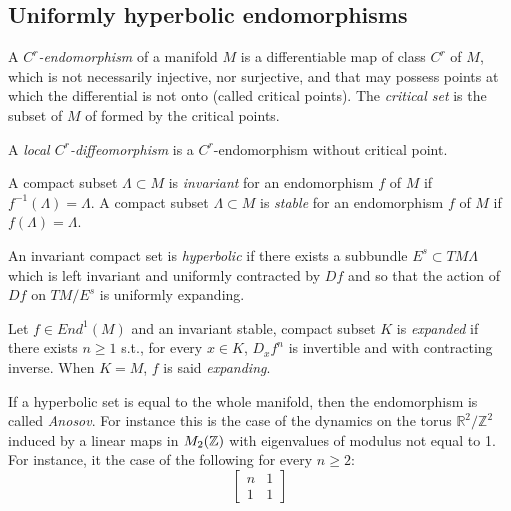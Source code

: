\documentclass[11pt,openany,leqno]{article}
\begin{document}
\subsection{Uniformly hyperbolic endomorphisms}


A \emph{$C^r$-endomorphism} of a manifold $M$ is a differentiable map of class $C^r$ of $M$, which is not necessarily injective, nor surjective, and that may possess points at which the differential is not onto (called critical points). The \emph{critical set} is the subset of $M$ of formed by the critical points. 

A \emph{local $C^r$-diffeomorphism} is a $C^r$-endomorphism without critical point.

A compact subset $\Lambda\subset M$ is \emph{invariant} for an endomorphism $f$ of $M$ if $f^{-1} (\Lambda)=\Lambda$. 
A compact subset $\Lambda\subset M$ is \emph{stable} for an endomorphism $f$ of $M$ if $f (\Lambda)=\Lambda$.

An invariant compact set is \emph{hyperbolic} if there exists a subbundle $E^s\subset TM \Lambda$ which is left invariant  and uniformly contracted by $Df$ and so that the action of $Df$ on $TM/E^s$ is uniformly expanding.

\begin{exam}
Let $f\in End^1(M)$ and  an invariant stable, compact  subset $K$ is \emph{expanded} if there exists $n\ge 1$ s.t., for every $x\in K$,  $D_xf^n$ is invertible and with contracting inverse. When  $K=M$, $f$ is said \emph{expanding}.
\end{exam}   
\begin{exam} If a hyperbolic set is equal to the whole manifold, then the endomorphism is called \emph{Anosov}. 
For instance this is the case of the dynamics on the torus $\mathbb R^2/\mathbb Z^2$ induced by a linear maps in $M_2(\mathbb Z)$ with eigenvalues of modulus not equal to 1. For instance, it the case of the following for every $n\ge 2$:
\[\left[\begin{array}{cc}
n&1\\
1&1\end{array}\right]\]
\end{exam}    

\end{document}
